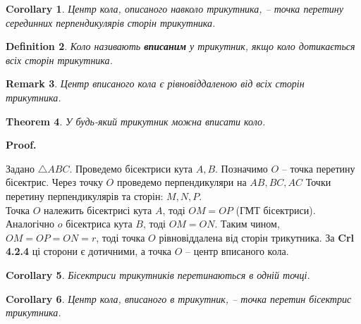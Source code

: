 \documentclass[a4paper, 10pt]{article}
\makeatletter
\theoremstyle{theoremdd}
\newtheorem{theorem}{Theorem}[subsection]
\theoremstyle{theoremdd}
\theoremstyle{theoremdd}
\newtheorem{definition}[theorem]{Definition}
\theoremstyle{theoremdd}
\theoremstyle{theoremdd}
\theoremstyle{theoremdd}
\theoremstyle{theoremdd}
\newtheorem{remark}[theorem]{Remark}
\theoremstyle{theoremdd}
\theoremstyle{theoremdd}
\newtheorem{corollary}[theorem]{Corollary}
\renewenvironment{proof}[1][Proof.\\]{\par
\pushQED{\hfill \qed}%
\normalfont \topsep6\p@\@plus6\p@\relax
\trivlist
\item\relax
{\bfseries
#1\@addpunct{.}}\hspace\labelsep\ignorespaces
}{%
\popQED\endtrivlist\@endpefalse
}
\makeatother
\begin{document}
\begin{corollary}
Центр кола, описаного навколо трикутника, -- точка перетину серединних перпендикулярів сторін трикутника.
\end{corollary}

\begin{definition}
Коло називають \textbf{вписаним} у трикутник, якщо коло дотикається всіх сторін трикутника.
\begin{figure}[H]
\centering
{}
\end{figure}
\end{definition}

\begin{remark}
Центр вписаного кола є рівновіддаленою від всіх сторін трикутника.
\end{remark}

\begin{theorem}
У будь-який трикутник можна вписати коло.
\end{theorem}

\begin{proof}
Задано $\triangle ABC$. Проведемо бісектриси кута $A,B$. Позначимо $O$ -- точка перетину бісектрис. Через точку $O$ проведемо перпендикуляри на $AB,BC,AC$ Точки перетину перпендикулярів та сторін: $M,N,P$.\\
Точка $O$ належить бісектрисі кута $A$, тоді $OM = OP$ (ГМТ бісектриси). Аналогічно $o$ бісектриса кута $B$, тоді $OM = ON$. Таким чином, $OM = OP = ON = r$, тоді точка $O$ рівновіддалена від сторін трикутника. За \textbf{Crl 4.2.4} ці сторони є дотичними, а точка $O$ -- центр вписаного кола.
\end{proof}

\begin{corollary}
Бісектриси трикутників перетинаються в одній точці.
\end{corollary}

\begin{corollary}
Центр кола, вписаного в трикутник, -- точка перетин бісектрис трикутника.
\end{corollary}
\end{document}
